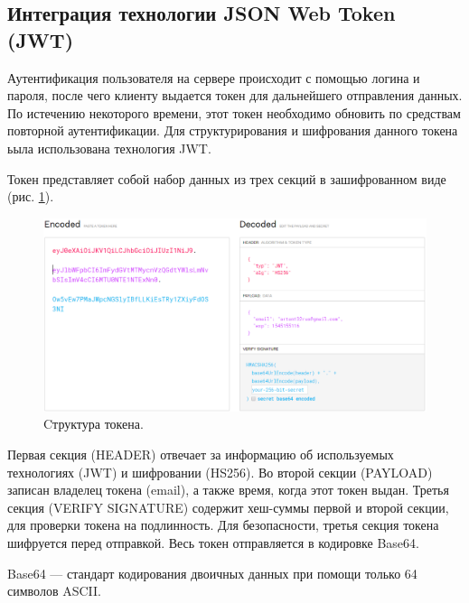 \subsection{Интеграция технологии JSON Web Token (JWT)}
Аутентификация пользователя на сервере происходит с помощью логина и пароля, после чего клиенту выдается токен для дальнейшего отправления данных.
По истечению некоторого времени, этот токен необходимо обновить по средствам повторной аутентификации.
Для структурирования и шифрования данного токена ьыла использована технология JWT.

Токен представляет собой набор данных из трех секций в зашифрованном виде (рис. \ref{fig:token1}).
\begin{figure}[h]
    \centering
    \includegraphics[width=1\linewidth]{img/token1.png}
    \caption{Cтруктура токена.}
    \label{fig:token1}
\end{figure}
Первая секция (HEADER) отвечает за информацию об используемых технологиях (JWT) и шифровании (HS256).
Во второй секции (PAYLOAD) записан владелец токена (email), а также время, когда этот токен выдан.
Третья секция (VERIFY SIGNATURE) содержит хеш-суммы первой и второй секции, для проверки токена на подлинность.
Для безопасности, третья секция токена шифруется перед отправкой. Весь токен отправляется в кодировке Base64.
\begin{definition}
   Base64 --- стандарт кодирования двоичных данных при помощи только 64 символов ASCII.
\end{definition}


\clearpage
